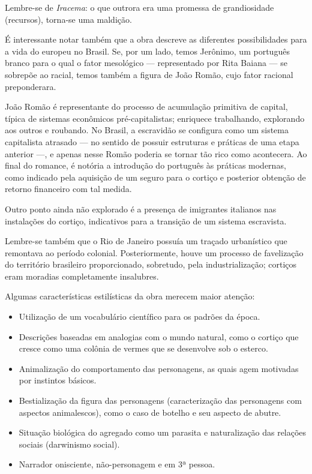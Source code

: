 Lembre-se de \textit{Iracema}: o que outrora era uma promessa de grandiosidade (recursos), torna-se uma maldição.

É interessante notar também que a obra descreve as diferentes possibilidades para a vida do europeu no Brasil. Se, por um lado, temos Jerônimo, um português branco para o qual o fator mesológico — representado por Rita Baiana — se sobrepõe ao racial, temos também a figura de João Romão, cujo fator racional preponderara.

João Romão é representante do processo de acumulação primitiva de capital, típica de sistemas econômicos pré-capitalistas; enriquece trabalhando, explorando aos outros e roubando. No Brasil, a escravidão se configura como um sistema capitalista atrasado — no sentido de possuir estruturas e práticas de uma etapa anterior —, e apenas nesse Romão poderia se tornar tão rico como acontecera. Ao final do romance, é notória a introdução do português às práticas modernas, como indicado pela aquisição de um seguro para o cortiço e posterior obtenção de retorno financeiro com tal medida.

Outro ponto ainda não explorado é a presença de imigrantes italianos nas instalações do cortiço, indicativos para a transição de um sistema escravista.

Lembre-se também que o Rio de Janeiro possuía um traçado urbanístico que remontava ao período colonial. Posteriormente, houve um processo de favelização do território brasileiro proporcionado, sobretudo, pela industrialização; cortiços eram moradias completamente insalubres.

Algumas características estilísticas da obra merecem maior atenção:

\begin{itemize}
\item Utilização de um vocabulário científico para os padrões da época.
\item Descrições baseadas em analogias com o mundo natural, como o cortiço que cresce como uma colônia de vermes que se desenvolve sob o esterco.
\item Animalização do comportamento das personagens, as quais agem motivadas por instintos básicos.
\item Bestialização da figura das personagens (caracterização das personagens com aspectos animalescos), como o caso de botelho e seu aspecto de abutre.
\item Situação biológica do agregado como um parasita e naturalização das relações sociais (darwinismo social).
\item Narrador onisciente, não-personagem e em 3ª pessoa.
\end{itemize}

